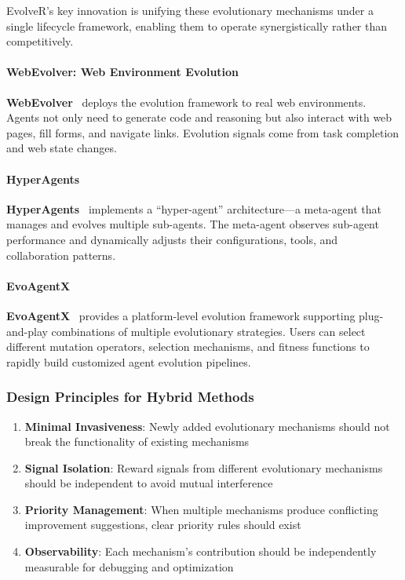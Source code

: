 EvolveR's key innovation is unifying these evolutionary mechanisms under a single lifecycle framework, enabling them to operate synergistically rather than competitively.

\paragraph{WebEvolver: Web Environment Evolution}

\textbf{WebEvolver}~\citep{webevolver2024} deploys the evolution framework to real web environments. Agents not only need to generate code and reasoning but also interact with web pages, fill forms, and navigate links. Evolution signals come from task completion and web state changes.

\paragraph{HyperAgents}

\textbf{HyperAgents}~\citep{hyperagents2024} implements a ``hyper-agent'' architecture---a meta-agent that manages and evolves multiple sub-agents. The meta-agent observes sub-agent performance and dynamically adjusts their configurations, tools, and collaboration patterns.

\paragraph{EvoAgentX}

\textbf{EvoAgentX}~\citep{evoagentx2024} provides a platform-level evolution framework supporting plug-and-play combinations of multiple evolutionary strategies. Users can select different mutation operators, selection mechanisms, and fitness functions to rapidly build customized agent evolution pipelines.

\subsubsection{Design Principles for Hybrid Methods}

\begin{enumerate}
\item \textbf{Minimal Invasiveness}: Newly added evolutionary mechanisms should not break the functionality of existing mechanisms
\item \textbf{Signal Isolation}: Reward signals from different evolutionary mechanisms should be independent to avoid mutual interference
\item \textbf{Priority Management}: When multiple mechanisms produce conflicting improvement suggestions, clear priority rules should exist
\item \textbf{Observability}: Each mechanism's contribution should be independently measurable for debugging and optimization
\end{enumerate}

